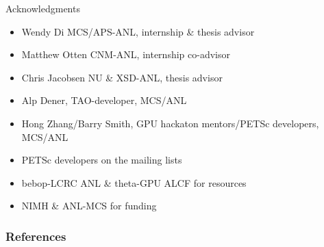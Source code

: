 \documentclass{beamer}
\begin{document}
\begin{frame}{Acknowledgments}
	\begin{itemize}
		\item \alert{Wendy Di} MCS/APS-ANL, internship \& thesis advisor
		\item \alert{Matthew Otten} CNM-ANL, internship co-advisor
		\item \alert{Chris Jacobsen} NU \& XSD-ANL, thesis advisor
		\item \alert{Alp Dener}, TAO-developer, MCS/ANL
		\item \alert{Hong Zhang/Barry Smith}, GPU hackaton mentors/PETSc developers, MCS/ANL
		\item \alert{PETSc developers} on the mailing lists
		\item \alert{bebop-LCRC} ANL \& \alert{theta-GPU} ALCF for resources
		\item \alert{NIMH} \& \alert{ANL-MCS} for funding
	\end{itemize}
\end{frame}

\renewcommand*{\bibfont}{\scriptsize}
\begin{frame}[t, allowframebreaks]
	\frametitle{References}
	
	
\end{frame}
\end{document}
